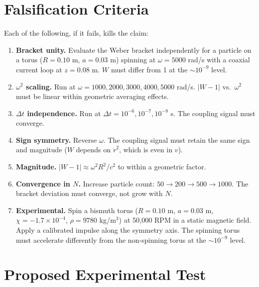 \documentclass[12pt,preprint,amsmath,amssymb]{revtex4-2}
\begin{document}
\section{Falsification Criteria}
\label{sec:falsification}

Each of the following, if it fails, kills the claim:

\begin{enumerate}
\item \textbf{Bracket unity.} Evaluate the Weber bracket independently for a
  particle on a torus ($R = 0.10$ m, $a = 0.03$ m) spinning at $\omega = 5000$ rad/s
  with a coaxial current loop at $z = 0.08$ m. $W$ must differ from 1 at the
  $\sim\!10^{-9}$ level.

\item \textbf{$\omega^2$ scaling.} Run at $\omega = 1000, 2000, 3000, 4000, 5000$ rad/s.
  $|W - 1|$ vs.\ $\omega^2$ must be linear within geometric averaging effects.

\item \textbf{$\Delta t$ independence.} Run at $\Delta t = 10^{-6}, 10^{-7}, 10^{-8}$ s.
  The coupling signal must converge.

\item \textbf{Sign symmetry.} Reverse $\omega$. The coupling signal must retain
  the same sign and magnitude ($W$ depends on $\dot{r}^2$, which is even in $v$).

\item \textbf{Magnitude.} $|W - 1| \approx \omega^2 R^2/c^2$ to within a geometric factor.

\item \textbf{Convergence in $N$.} Increase particle count: $50 \to 200 \to 500 \to 1000$.
  The bracket deviation must converge, not grow with $N$.

\item \textbf{Experimental.} Spin a bismuth torus ($R = 0.10$ m, $a = 0.03$ m,
  $\chi = -1.7 \times 10^{-4}$, $\rho = 9780$ kg/m$^3$) at 50{,}000 RPM in a static
  magnetic field. Apply a calibrated impulse along the symmetry axis. The spinning torus
  must accelerate differently from the non-spinning torus at the $\sim\!10^{-9}$ level.
\end{enumerate}

\section{Proposed Experimental Test}
\label{sec:experiment}
\end{document}
